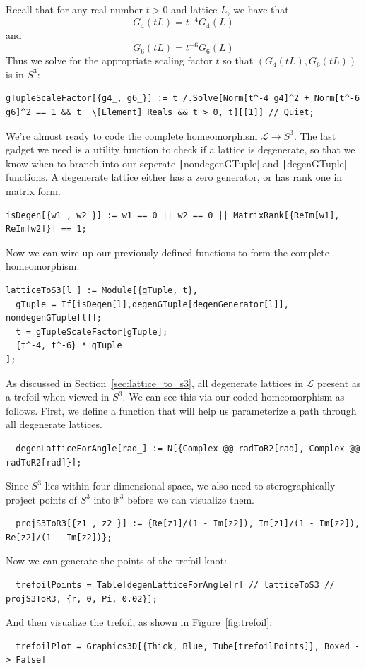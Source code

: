 \documentclass[12pt,twoside]{reedthesis}
\theoremstyle{definition}
\newcommand{\R}{\mathbb{R}}
\newcommand{\LS}{\mathcal{L}}
\begin{document}
Recall that for any real number $t > 0$ and lattice $L$, we have that
\begin{equation*}
  G_4(tL) = t^{-4}G_4(L)
\end{equation*}
and
\begin{equation*}
  G_6(tL) = t^{-6} G_6(L)
\end{equation*}
Thus we solve for the appropriate scaling factor $t$ so that $(G_4(tL), G_6(tL))$ is in $S^3$:
\begin{verbatim}
gTupleScaleFactor[{g4_, g6_}] := t /.Solve[Norm[t^-4 g4]^2 + Norm[t^-6 g6]^2 == 1 && t  \[Element] Reals && t > 0, t][[1]] // Quiet;
\end{verbatim}

We're almost ready to code the complete homeomorphism $\LS \to S^3$.
The last gadget we need is a utility function to check if a lattice is degenerate, so that we know when to branch into our seperate \texttt|nondegenGTuple| and \texttt|degenGTuple| functions.
A degenerate lattice either has a zero generator, or has rank one in matrix form.
\begin{verbatim}
isDegen[{w1_, w2_}] := w1 == 0 || w2 == 0 || MatrixRank[{ReIm[w1], ReIm[w2]}] == 1;
\end{verbatim}
Now we can wire up our previously defined functions to form the complete homeomorphism.
\begin{verbatim}
latticeToS3[l_] := Module[{gTuple, t},
  gTuple = If[isDegen[l],degenGTuple[degenGenerator[l]], nondegenGTuple[l]]; 
  t = gTupleScaleFactor[gTuple];
  {t^-4, t^-6} * gTuple
];
\end{verbatim}
As discussed in Section~\ref{sec:lattice_to_s3}, all degenerate lattices in $\LS$ present as a trefoil when viewed in $S^3$.
We can see this via our coded homeomorphism as follows.
First, we define a function that will help us parameterize a path through all degenerate lattices.
\begin{verbatim}
  degenLatticeForAngle[rad_] := N[{Complex @@ radToR2[rad], Complex @@ radToR2[rad]}];
\end{verbatim}
Since $S^3$ lies within four-dimensional space, we also need to sterographically project points of $S^3$ into $\R^3$ before we can visualize them.
\begin{verbatim}
  projS3ToR3[{z1_, z2_}] := {Re[z1]/(1 - Im[z2]), Im[z1]/(1 - Im[z2]), Re[z2]/(1 - Im[z2])};
\end{verbatim}
Now we can generate the points of the trefoil knot:
\begin{verbatim}
  trefoilPoints = Table[degenLatticeForAngle[r] // latticeToS3 // projS3ToR3, {r, 0, Pi, 0.02}];
\end{verbatim}
And then visualize the trefoil, as shown in Figure~\ref{fig:trefoil}:
\begin{verbatim}
  trefoilPlot = Graphics3D[{Thick, Blue, Tube[trefoilPoints]}, Boxed -> False]
\end{verbatim}
\end{document}
